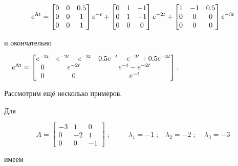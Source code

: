 \begin{equation*}
e^{\normalsubformula{\text{At}}}=\left[\begin{matrix}0&0&0.5\\0&0&1\\0&0&1\end{matrix}\right]e^{-t}+\left[\begin{matrix}0&1&-1\\0&1&-1\\0&0&0\end{matrix}\right]e^{-2t}+\left[\begin{matrix}1&-1&0.5\\0&0&0\\0&0&0\end{matrix}\right]e^{-3t}
\end{equation*}

		и окончательно



		\ \ 
		$e^{\normalsubformula{\text{At}}}=\left[\begin{matrix}e^{-3t}&e^{-2t}-e^{-3t}&0.5e^{-t}-e^{-2t}+0.5e^{-3t}\\0&e^{-2t}&e^{-t}-e^{-2t}\\0&0&e^{-t}\end{matrix}\right]$.



		Рассмотрим ещё несколько примеров.



		Для


\begin{equation*}
A=\left[\begin{matrix}-3&1&0\\0&-2&1\\0&0&-1\end{matrix}\right]\;;\;\;\;\;\;\;\;\;\;\lambda _1=-1\;;\;\;\;\lambda _2=-2\;;\;\;\;\;\lambda _3=-3
\end{equation*}

		имеем


